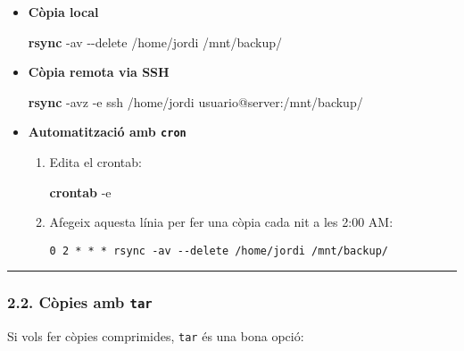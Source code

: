 \documentclass[
  12 pt,
  a4paper,
]{article}
\newenvironment{Shaded}{\begin{snugshade}}{\end{snugshade}}
\newcommand{\AttributeTok}[1]{\textcolor[rgb]{0.13,0.29,0.53}{#1}}
\newcommand{\FunctionTok}[1]{\textcolor[rgb]{0.13,0.29,0.53}{\textbf{#1}}}
\newcommand{\NormalTok}[1]{#1}
\begin{document}
\begin{itemize}
\item
  \textbf{Còpia local}

\begin{Shaded}
\begin{Highlighting}[]
\FunctionTok{rsync} \AttributeTok{{-}av} \AttributeTok{{-}{-}delete}\NormalTok{ /home/jordi /mnt/backup/}
\end{Highlighting}
\end{Shaded}
\item
  \textbf{Còpia remota via SSH}

\begin{Shaded}
\begin{Highlighting}[]
\FunctionTok{rsync} \AttributeTok{{-}avz} \AttributeTok{{-}e}\NormalTok{ ssh /home/jordi usuario@server:/mnt/backup/}
\end{Highlighting}
\end{Shaded}
\item
  \textbf{Automatització amb \texttt{cron}}

  \begin{enumerate}
  \def\labelenumi{\arabic{enumi}.}
  \item
    Edita el crontab:

\begin{Shaded}
\begin{Highlighting}[]
\FunctionTok{crontab} \AttributeTok{{-}e}
\end{Highlighting}
\end{Shaded}
  \item
    Afegeix aquesta línia per fer una còpia cada nit a les 2:00 AM:

\begin{verbatim}
0 2 * * * rsync -av --delete /home/jordi /mnt/backup/
\end{verbatim}
  \end{enumerate}
\end{itemize}

\begin{center}\rule{0.5\linewidth}{0.5pt}\end{center}

\subsubsection{\texorpdfstring{2.2. Còpies amb
\texttt{tar}}{2.2. Còpies amb tar}}\label{cuxf2pies-amb-tar}

Si vols fer còpies comprimides, \texttt{tar} és una bona opció:
\end{document}
